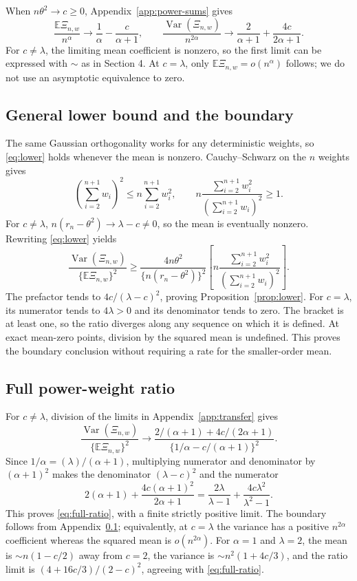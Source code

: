\documentclass[11pt]{article}
\theoremstyle{definition}
\begin{document}
When $n\theta^2\to c\ge0$, Appendix~\ref{app:power-sums} gives
\[
\frac{\mathbb E\Xi_{n,w}}{n^\alpha}
\to\frac1\alpha-\frac{c}{\alpha+1},\qquad
\frac{\operatorname{Var}(\Xi_{n,w})}{n^{2\alpha}}
\to\frac2{\alpha+1}+\frac{4c}{2\alpha+1}.
\]
For $c\ne\lambda$, the limiting mean coefficient is nonzero, so
the first limit can be expressed with $\sim$ as in Section 4.
At $c=\lambda$, only $\mathbb E\Xi_{n,w}=o(n^\alpha)$ follows;
we do not use an asymptotic equivalence to zero.

\subsection{General lower bound and the boundary}\label{app:general-lower}
The same Gaussian orthogonality works for any deterministic weights,
so \eqref{eq:lower} holds whenever the mean is nonzero. Cauchy--Schwarz
on the $n$ weights gives
\[
(\sum_{i=2}^{n+1}w_i)^2\le n\sum_{i=2}^{n+1}w_i^2,
\qquad
n\frac{\sum_{i=2}^{n+1}w_i^2}{(\sum_{i=2}^{n+1}w_i)^2}\ge1.
\]
For $c\ne\lambda$, $n(r_n-\theta^2)\to\lambda-c\ne0$, so the
mean is eventually nonzero. Rewriting \eqref{eq:lower} yields
\[
\frac{\operatorname{Var}(\Xi_{n,w})}{\{\mathbb E\Xi_{n,w}\}^2}
\ge
\frac{4n\theta^2}{\{n(r_n-\theta^2)\}^2}
\left[n\frac{\sum_{i=2}^{n+1}w_i^2}
{(\sum_{i=2}^{n+1}w_i)^2}\right].
\]
The prefactor tends to $4c/(\lambda-c)^2$, proving
Proposition~\ref{prop:lower}. For $c=\lambda$, its numerator tends to
$4\lambda>0$ and its denominator tends to zero. The bracket is at
least one, so the ratio diverges along any sequence on which it is
defined. At exact mean-zero points, division by the squared mean is
undefined. This proves the boundary conclusion without requiring
a rate for the smaller-order mean.

\subsection{Full power-weight ratio}\label{app:power-ratio}
For $c\ne\lambda$, division of the limits in
Appendix~\ref{app:transfer} gives
\[
\frac{\operatorname{Var}(\Xi_{n,w})}{\{\mathbb E\Xi_{n,w}\}^2}
\to
\frac{2/(\alpha+1)+4c/(2\alpha+1)}
{\{1/\alpha-c/(\alpha+1)\}^2}.
\]
Since $1/\alpha=(\lambda)/(\alpha+1)$, multiplying numerator and
denominator by $(\alpha+1)^2$ makes the denominator
$(\lambda-c)^2$ and the numerator
\[
2(\alpha+1)+\frac{4c(\alpha+1)^2}{2\alpha+1}
=\frac{2\lambda}{\lambda-1}
+\frac{4c\lambda^2}{\lambda^2-1}.
\]
This proves \eqref{eq:full-ratio}, with a finite strictly positive
limit. The boundary follows from Appendix~\ref{app:general-lower};
equivalently, at $c=\lambda$ the variance has a positive
$n^{2\alpha}$ coefficient whereas the squared mean is $o(n^{2\alpha})$.
For $\alpha=1$ and $\lambda=2$, the mean is
$\sim n(1-c/2)$ away from $c=2$, the variance is
$\sim n^2(1+4c/3)$, and the ratio limit is
$(4+16c/3)/(2-c)^2$, agreeing with \eqref{eq:full-ratio}.
\end{document}
